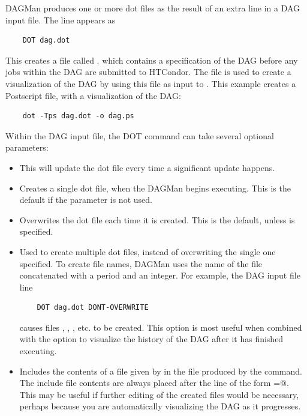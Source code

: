 DAGMan produces one or more dot files as the result of
an extra line
in a DAG input file. 
The line appears as
\begin{verbatim}
    DOT dag.dot
\end{verbatim}

This creates a file called .
which contains
a specification of the DAG before any jobs within the DAG
are submitted to HTCondor.
The  file is used to create a visualization
of the DAG by using this file as input to .
This example creates a Postscript file, with a visualization of the DAG:

\begin{verbatim}
    dot -Tps dag.dot -o dag.ps
\end{verbatim}

Within the DAG input file,
the DOT command can take several optional parameters:

\begin{itemize}

\item {}  This will update the dot file every time a
significant update happens. 

\item {} Creates a single dot file, when
the DAGMan begins executing. This is the default if the parameter
 is not used.

\item {} Overwrites the dot file each time it
is created. This is the default, unless 
is specified.

\item {} Used to create multiple dot files, instead
of overwriting the single one specified.
To create file names,
DAGMan uses the name of the file concatenated with a period and an
integer. For example, the DAG input file line
\begin{verbatim}
    DOT dag.dot DONT-OVERWRITE
\end{verbatim}
causes files
,
,
,
etc. to be created.
This option is
most useful when combined with the  option to
visualize the history of the DAG after it has finished executing. 

\item {} Includes the contents
of a file given by  in the file produced by the
 command.
The include file contents are always placed after the line of
the form
\verb@label=@.
This may be useful if further editing of the created files would
be necessary,
perhaps because you are automatically visualizing the DAG as it
progresses. 

\end{itemize}

